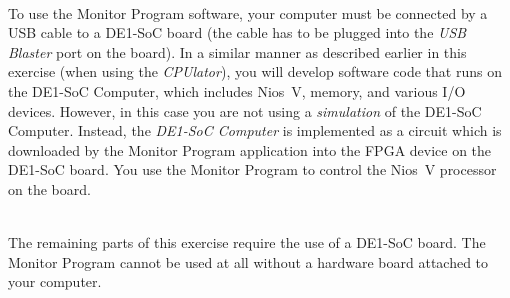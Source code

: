 \documentclass[epsfig,10pt,fullpage]{article}
\begin{document}
~\\
\noindent
To use the Monitor Program software, your computer must be connected by a USB cable to a 
DE1-SoC board (the cable has to be plugged into the {\it USB Blaster} port on the board).
In a similar manner as described earlier in this exercise (when using the {\it CPUlator}), you 
will develop software code that runs on the DE1-SoC Computer, 
which includes Nios~V, memory, and various I/O devices.
However, in this case you are not using a {\it simulation} of the DE1-SoC Computer. Instead, 
the {\it DE1-SoC Computer} is implemented as a circuit which is downloaded by the Monitor
Program application into the FPGA device on the DE1-SoC board. You use the Monitor Program to 
control the Nios~V processor on the board.

~\\
\noindent
The remaining parts of this exercise require the use of a DE1-SoC board. The Monitor
Program cannot be used at all without a hardware board attached to your computer.
\end{document}
